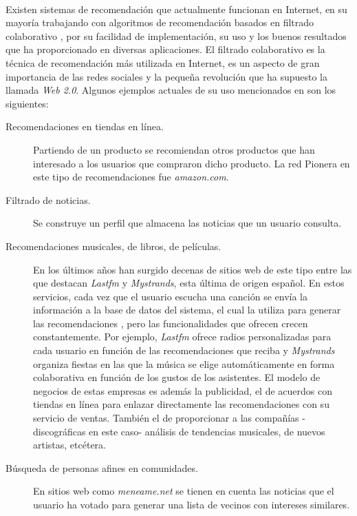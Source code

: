 \documentclass[12pt,letterpaper,oneside] {memoir}
\begin{document}
\paragraph{}
Existen sistemas de recomendación que actualmente funcionan en Internet, en su mayoría trabajando con algoritmos de recomendación basados en filtrado colaborativo \cite{Schafer2001, Goldberg1992}, por su facilidad de implementación, su uso y los buenos resultados que ha proporcionado en diversas aplicaciones.
El filtrado colaborativo es la técnica de recomendación más utilizada en Internet, es un aspecto de gran importancia de las redes sociales  y la pequeña revolución que ha supuesto la llamada \textit{Web 2.0}. Algunos ejemplos actuales de su uso mencionados en \cite{GalanNieto1994} son los siguientes:
\begin{description}
\item[Recomendaciones en tiendas en línea.] Partiendo de un producto se recomiendan otros productos que han interesado a los usuarios que compraron dicho producto. La red Pionera en este tipo de recomendaciones fue \textit{amazon.com}.
\item[Filtrado de noticias.] Se construye un perfil que almacena las noticias que un usuario consulta.
\item[Recomendaciones musicales, de libros, de películas.] En los últimos años han surgido decenas de sitios web de este tipo entre las que destacan \textit{Lastfm} y \textit{Mystrands}, esta última de origen español. En estos servicios, cada vez que el usuario escucha una canción se envía la información a la base de datos del sistema, el cual la utiliza para generar las recomendaciones , pero las funcionalidades que ofrecen crecen constantemente. Por ejemplo, \textit{Lastfm} ofrece radios personalizadas para cada usuario en función de las recomendaciones que reciba y  \textit{Mystrands} organiza fiestas en las que la música  se elige automáticamente en forma colaborativa en función de los gustos de los asistentes. El modelo de negocios de estas empresas es además la publicidad, el de acuerdos con tiendas en línea para enlazar directamente las recomendaciones con su servicio de ventas. También el de proporcionar a las compañías -discográficas en este caso- análisis de tendencias musicales, de nuevos artistas, etcétera.
\item[Búsqueda de personas afines en comunidades.] En sitios web como \textit{meneame.net} se tienen en cuenta las noticias que el usuario ha votado para generar una lista de vecinos con intereses similares.
\end{description}
\end{document}
